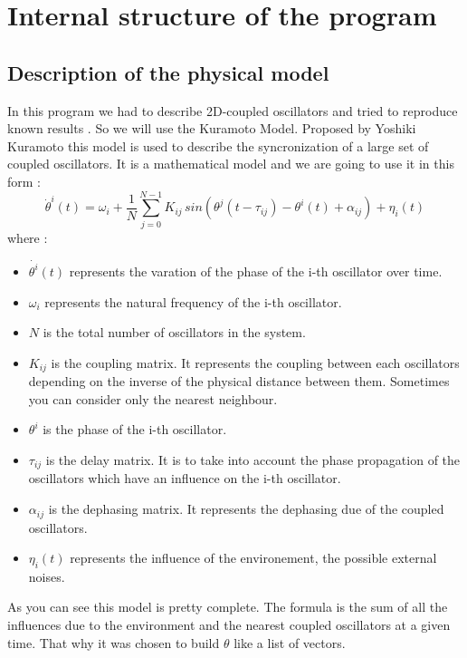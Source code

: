 \documentclass[1pt, a4paper]{article}
\begin{document}
\section{Internal structure of the program}
\label{sec:3}
\subsection{Description of the physical model}
\label{subs:3.1}
In this program we had to describe 2D-coupled oscillators and tried to reproduce known results \cite{josephson}. So we will use the Kuramoto Model. Proposed by Yoshiki Kuramoto this model is used to describe the syncronization of a large set of coupled oscillators. It is a mathematical model and we are going to use it in this form :
\begin{equation}
    \label{eq:kuramoto}
    \dot{\theta}^i(t)=\omega_ i + \dfrac{1}{N}\sum^{N-1}_{j=0}K_{ij}\,sin(\theta^j(t-\tau_{ij})-\theta^i(t)+\alpha_{ij}) + \eta_i(t)
\end{equation}
where :
\begin{itemize}[itemsep=0pt]
\item $\dot{\theta^i}(t)$ represents the varation of the phase of the i-th oscillator over time.
\item $\omega_i$ represents the natural frequency of the i-th oscillator.
\item $N$ is the total number of oscillators in the system.
\item $K_{ij}$ is the coupling matrix. It represents the coupling between each oscillators depending on the inverse of the physical distance between them. Sometimes you can consider only the nearest neighbour.
\item $\theta^i$ is the phase of the i-th oscillator.
\item $\tau_{ij}$ is the delay matrix. It is to take into account the phase propagation of the oscillators which have an influence on the i-th oscillator.
\item $\alpha_{ij}$ is the dephasing matrix. It represents the dephasing due of the coupled oscillators.
\item $\eta_i(t)$ represents the influence of the environement, the possible external noises.
\end{itemize}
As you can see this model is pretty complete. The formula is the sum of all the influences due to the environment and the nearest coupled oscillators at a given time. That why it was chosen to build $\theta$ like a list of vectors.
\end{document}
